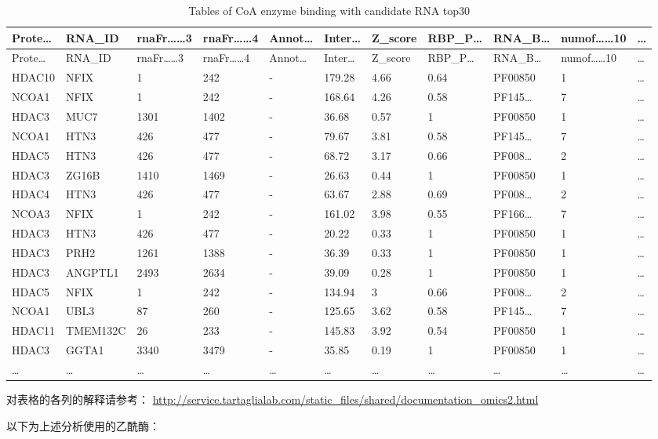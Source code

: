 \documentclass[
]{article}
\begin{document}
\begin{longtable}[]{@{}lllllllllll@{}}
\caption{\label{tab:tables-of-CoA-enzyme-binding-with-candidate-RNA-top30}Tables of CoA enzyme binding with candidate RNA top30}\tabularnewline
\toprule
Prote\ldots{} & RNA\_ID & rnaFr\ldots\ldots3 & rnaFr\ldots\ldots4 & Annot\ldots{} & Inter\ldots{} & Z\_score & RBP\_P\ldots{} & RNA\_B\ldots{} & numof\ldots\ldots10 & \ldots{}\tabularnewline
\midrule
\endfirsthead
\toprule
Prote\ldots{} & RNA\_ID & rnaFr\ldots\ldots3 & rnaFr\ldots\ldots4 & Annot\ldots{} & Inter\ldots{} & Z\_score & RBP\_P\ldots{} & RNA\_B\ldots{} & numof\ldots\ldots10 & \ldots{}\tabularnewline
\midrule
\endhead
HDAC10 & NFIX & 1 & 242 & - & 179.28 & 4.66 & 0.64 & PF00850 & 1 & \ldots{}\tabularnewline
NCOA1 & NFIX & 1 & 242 & - & 168.64 & 4.26 & 0.58 & PF145\ldots{} & 7 & \ldots{}\tabularnewline
HDAC3 & MUC7 & 1301 & 1402 & - & 36.68 & 0.57 & 1 & PF00850 & 1 & \ldots{}\tabularnewline
NCOA1 & HTN3 & 426 & 477 & - & 79.67 & 3.81 & 0.58 & PF145\ldots{} & 7 & \ldots{}\tabularnewline
HDAC5 & HTN3 & 426 & 477 & - & 68.72 & 3.17 & 0.66 & PF008\ldots{} & 2 & \ldots{}\tabularnewline
HDAC3 & ZG16B & 1410 & 1469 & - & 26.63 & 0.44 & 1 & PF00850 & 1 & \ldots{}\tabularnewline
HDAC4 & HTN3 & 426 & 477 & - & 63.67 & 2.88 & 0.69 & PF008\ldots{} & 2 & \ldots{}\tabularnewline
NCOA3 & NFIX & 1 & 242 & - & 161.02 & 3.98 & 0.55 & PF166\ldots{} & 7 & \ldots{}\tabularnewline
HDAC3 & HTN3 & 426 & 477 & - & 20.22 & 0.33 & 1 & PF00850 & 1 & \ldots{}\tabularnewline
HDAC3 & PRH2 & 1261 & 1388 & - & 36.39 & 0.33 & 1 & PF00850 & 1 & \ldots{}\tabularnewline
HDAC3 & ANGPTL1 & 2493 & 2634 & - & 39.09 & 0.28 & 1 & PF00850 & 1 & \ldots{}\tabularnewline
HDAC5 & NFIX & 1 & 242 & - & 134.94 & 3 & 0.66 & PF008\ldots{} & 2 & \ldots{}\tabularnewline
NCOA1 & UBL3 & 87 & 260 & - & 125.65 & 3.62 & 0.58 & PF145\ldots{} & 7 & \ldots{}\tabularnewline
HDAC11 & TMEM132C & 26 & 233 & - & 145.83 & 3.92 & 0.54 & PF00850 & 1 & \ldots{}\tabularnewline
HDAC3 & GGTA1 & 3340 & 3479 & - & 35.85 & 0.19 & 1 & PF00850 & 1 & \ldots{}\tabularnewline
\ldots{} & \ldots{} & \ldots{} & \ldots{} & \ldots{} & \ldots{} & \ldots{} & \ldots{} & \ldots{} & \ldots{} & \ldots{}\tabularnewline
\bottomrule
\end{longtable}

对表格的各列的解释请参考： \url{http://service.tartaglialab.com/static_files/shared/documentation_omics2.html}

以下为上述分析使用的乙酰酶：
\end{document}
